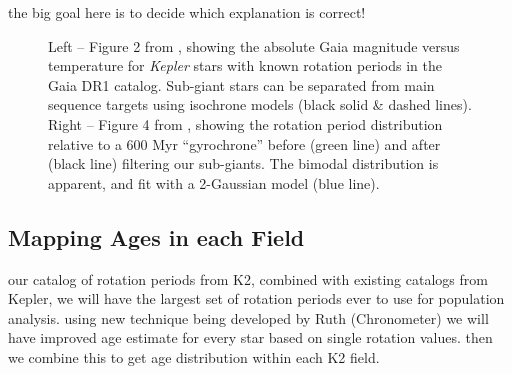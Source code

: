 \documentclass[12pt]{article}
\newcommand{\Kepler}{\textsl{Kepler}\xspace}
\begin{document}
the big goal here is to decide which explanation is correct!

\begin{figure}[!th]
\centering
{}
\caption{Left -- Figure 2 from \citet{davenport2017}, showing the absolute Gaia magnitude versus temperature for \Kepler stars with known rotation periods in the Gaia DR1 catalog. Sub-giant stars can be separated from main sequence targets using isochrone models (black solid \& dashed lines). Right -- Figure 4 from \citet{davenport2017}, showing the rotation period distribution relative to a 600 Myr ``gyrochrone'' before (green line) and after (black line) filtering our sub-giants. The bimodal distribution is apparent, and fit with a 2-Gaussian model (blue line).}
\label{fig:cmd}
\end{figure}




\subsection{Mapping Ages in each Field}
our catalog of rotation periods from K2, combined with existing catalogs from Kepler, we will have the largest set of rotation periods ever to use for population analysis. using new technique being developed by Ruth (Chronometer) we will have improved age estimate for every star based on single rotation values. then we combine this to get age distribution within each K2 field.
\end{document}
